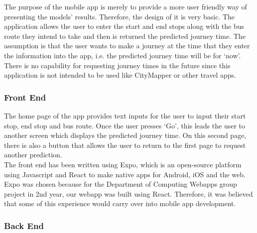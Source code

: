 The purpose of the mobile app is merely to provide a more user friendly way of presenting the models' results. Therefore, the design of it is very basic. The application allows the user to enter the start and end stops along with the bus route they intend to take and then is returned the predicted journey time. The assumption is that the user wants to make a journey at the time that they enter the information into the app, i.e. the predicted journey time will be for `now'. There is no capability for requesting journey times in the future since this application is not intended to be used like CityMapper or other travel apps.

\subsubsection{Front End}

The home page of the app provides text inputs for the user to input their start stop, end stop and bus route. Once the user presses `Go', this leads the user to another screen which displays the predicted journey time. On this second page, there is also a button that allows the user to return to the first page to request another prediction. \\

The front end has been written using Expo, which is an open-source platform using Javascript and React to make native apps for Android, iOS and the web. Expo was chosen because for the Department of Computing Webapps group project in 2nd year, our webapp was built using React. Therefore, it was believed that some of this experience would carry over into mobile app development.

\subsubsection{Back End}

\clearpage